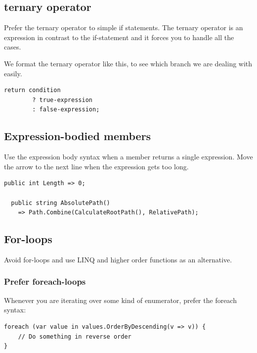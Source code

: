 \documentclass[11pt,a4paper]{article}
\begin{document}
\subsection{ternary operator}

Prefer the ternary operator to simple if statements. The ternary operator is an expression in contrast to the if-statement and it forces you to handle all the cases.

We format the ternary operator like this, to see which branch we are dealing with easily.

\begin{lstlisting}[language={[Sharp]C}, caption={ternary operator}]
    return condition
        ? true-expression
        : false-expression;
\end{lstlisting}

\subsection{Expression-bodied members}

Use the expression body syntax when a member returns a single expression.
Move the arrow to the next line when the expression gets too long.

\begin{lstlisting}[language={[Sharp]C}, caption={expression-bodied members}]
  public int Length => 0;

  public string AbsolutePath()
    => Path.Combine(CalculateRootPath(), RelativePath);
\end{lstlisting}

\subsection{For-loops}

Avoid for-loops and use LINQ and higher order functions as an alternative.

\subsubsection{Prefer foreach-loops}

Whenever you are iterating over some kind of enumerator, prefer the foreach syntax:

\begin{lstlisting}[language={[Sharp]C}, caption={foreach-loop}]
foreach (var value in values.OrderByDescending(v => v)) {
    // Do something in reverse order
}
\end{lstlisting}
\end{document}
